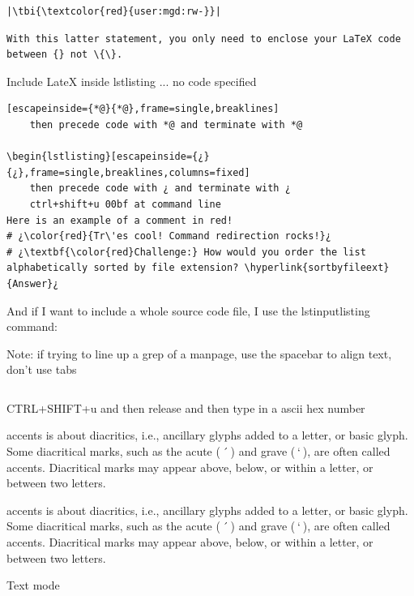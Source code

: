 \begin{verbatim}
|\tbi{\textcolor{red}{user:mgd:rw-}}|
\end{verbatim}

\begin{verbatim}
With this latter statement, you only need to enclose your LaTeX code between {} not \{\}.
\end{verbatim}

Include LateX inside lstlisting ... no code specified

\begin{lstlisting}[escapeinside={*@}{*@},frame=single,breaklines]
	then precede code with *@ and terminate with *@
	
\begin{lstlisting}[escapeinside={¿}{¿},frame=single,breaklines,columns=fixed]
	then precede code with ¿ and terminate with ¿
	ctrl+shift+u 00bf at command line
Here is an example of a comment in red!	
# ¿\color{red}{Tr\'es cool! Command redirection rocks!}¿ 
# ¿\textbf{\color{red}Challenge:} How would you order the list alphabetically sorted by file extension? \hyperlink{sortbyfileext}{Answer}¿ 	
\end{lstlisting}

And if I want to include a whole source code file, I use the lstinputlisting command:



Note: if trying to line up a grep of a manpage, use the spacebar to align text, don't use tabs
\begin{verbatim}
\end{verbatim}

CTRL+SHIFT+u and then release and then type in a ascii hex number

{accents} is about diacritics, i.e., ancillary glyphs added to a letter, or basic glyph. Some diacritical marks, such as the acute ( ´ ) and grave ( ` ), are often called accents. Diacritical marks may appear above, below, or within a letter, or between two letters.

accents is about diacritics, i.e., ancillary glyphs added to a letter, or basic glyph. Some diacritical marks, such as the acute ( ´ ) and grave ( ` ), are often called accents. Diacritical marks may appear above, below, or within a letter, or between two letters.

Text mode

